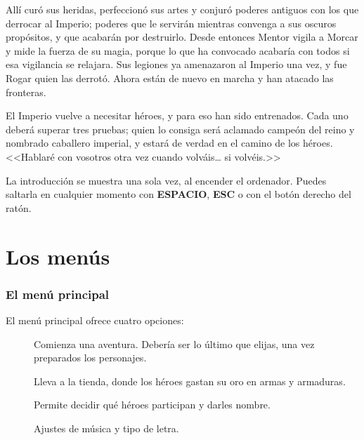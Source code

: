 Allí curó sus heridas, perfeccionó sus artes y conjuró poderes antiguos con
los que derrocar al Imperio; poderes que le servirán mientras convenga a
sus oscuros propósitos, y que acabarán por destruirlo. Desde entonces
Mentor vigila a Morcar y mide la fuerza de su magia, porque lo que ha
convocado acabaría con todos si esa vigilancia se relajara. Sus legiones ya
amenazaron al Imperio una vez, y fue Rogar quien las derrotó. Ahora están
de nuevo en marcha y han atacado las fronteras.


El Imperio vuelve a necesitar héroes, y para eso han sido entrenados. Cada
uno deberá superar tres pruebas; quien lo consiga será aclamado campeón del
reino y nombrado caballero imperial, y estará de verdad en el camino de los
héroes. <<Hablaré con vosotros otra vez cuando volváis\ldots{} si volvéis.>>

La introducción se muestra una sola vez, al encender el ordenador. Puedes
saltarla en cualquier momento con \textbf{ESPACIO}, \textbf{ESC} o con el
botón derecho del ratón.

\chapter{Los menús}
\label{cap:menus}

\subsection{El menú principal}


El menú principal ofrece cuatro opciones:

\begin{description}
\item[] Comienza una aventura. Debería ser lo último que elijas,
  una vez preparados los personajes.
\item[] Lleva a la tienda, donde los héroes gastan su
  oro en armas y armaduras.
\item[] Permite decidir qué héroes participan y darles
  nombre.
\item[] Ajustes de música y tipo de letra.
\end{description}


